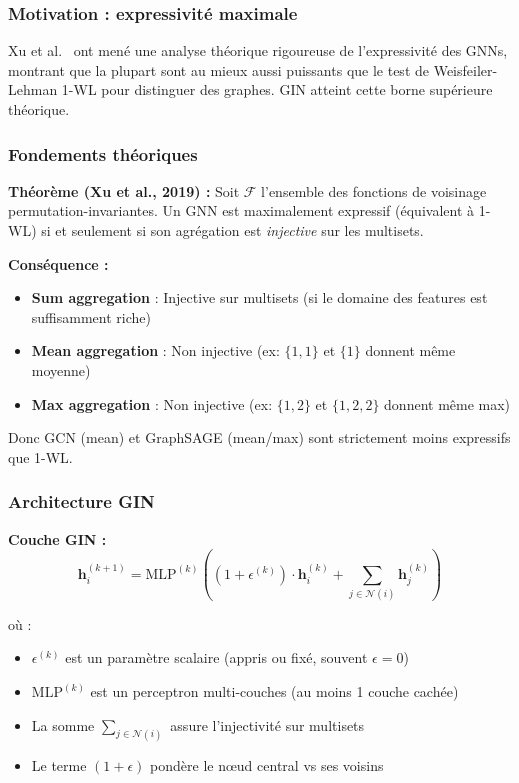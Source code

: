 \subsubsection{Motivation : expressivité maximale}

Xu et al.~\cite{Xu2019} ont mené une analyse théorique rigoureuse de l'expressivité des GNNs, montrant que la plupart sont au mieux aussi puissants que le test de Weisfeiler-Lehman 1-WL pour distinguer des graphes. GIN atteint cette borne supérieure théorique.

\subsubsection{Fondements théoriques}

\textbf{Théorème (Xu et al., 2019) :}
Soit $\mathcal{F}$ l'ensemble des fonctions de voisinage permutation-invariantes. Un GNN est maximalement expressif (équivalent à 1-WL) si et seulement si son agrégation est \textit{injective} sur les multisets.

\textbf{Conséquence :}
\begin{itemize}
    \item \textbf{Sum aggregation} : Injective sur multisets (si le domaine des features est suffisamment riche)
    \item \textbf{Mean aggregation} : Non injective (ex: $\{1,1\}$ et $\{1\}$ donnent même moyenne)
    \item \textbf{Max aggregation} : Non injective (ex: $\{1,2\}$ et $\{1,2,2\}$ donnent même max)
\end{itemize}

Donc GCN (mean) et GraphSAGE (mean/max) sont strictement moins expressifs que 1-WL.

\subsubsection{Architecture GIN}

\textbf{Couche GIN :}
\[
\mathbf{h}_i^{(k+1)} = \text{MLP}^{(k)}\left(\left(1 + \epsilon^{(k)}\right) \cdot \mathbf{h}_i^{(k)} + \sum_{j \in \mathcal{N}(i)} \mathbf{h}_j^{(k)}\right)
\]

où :
\begin{itemize}
    \item $\epsilon^{(k)}$ est un paramètre scalaire (appris ou fixé, souvent $\epsilon = 0$)
    \item $\text{MLP}^{(k)}$ est un perceptron multi-couches (au moins 1 couche cachée)
    \item La somme $\sum_{j \in \mathcal{N}(i)}$ assure l'injectivité sur multisets
    \item Le terme $(1 + \epsilon)$ pondère le nœud central vs ses voisins
\end{itemize}

